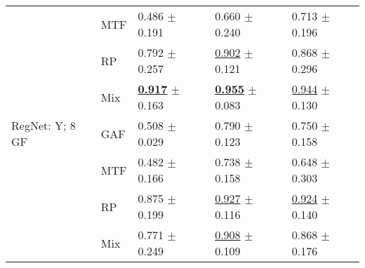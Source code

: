 \begin{tabular}{lllll}
 & MTF & \textcolor[rgb]{0.8357843137,0.1642156863,0}{0.486} $\pm$ \textcolor[rgb]{0.6819485050,0.3180514950,0}{0.191} & \textcolor[rgb]{0.9871624613,0.0128375387,0}{0.660} $\pm$ \textcolor[rgb]{1.0000000000,0.0000000000,0}{0.240} & \textcolor[rgb]{0.7984293194,0.2015706806,0}{0.713} $\pm$ \textcolor[rgb]{0.4651007353,0.5000000000,0}{0.196} \\
 & RP & \textcolor[rgb]{0.2426470588,0.5000000000,0}{0.792} $\pm$ \textcolor[rgb]{0.9202033436,0.0797966564,0}{0.257} & \underline{\textcolor[rgb]{0.1760231800,0.5000000000,0}{0.902}} $\pm$ \textcolor[rgb]{0.3351076707,0.5000000000,0}{0.121} & \textcolor[rgb]{0.3160994764,0.5000000000,0}{0.868} $\pm$ \textcolor[rgb]{0.9535567418,0.0464432582,0}{0.296} \\
 & Mix & \underline{\textbf{\textcolor[rgb]{0.0000000000,0.5000000000,0}{0.917}}} $\pm$ \textcolor[rgb]{0.5819876952,0.4180123048,0}{0.163} & \underline{\textbf{\textcolor[rgb]{0.0000000000,0.5000000000,0}{0.955}}} $\pm$ \textcolor[rgb]{0.1234823448,0.5000000000,0}{0.083} & \underline{\textcolor[rgb]{0.0785340314,0.5000000000,0}{0.944}} $\pm$ \textcolor[rgb]{0.1425478198,0.5000000000,0}{0.130} \\
RegNet: Y; 8 GF & GAF & \textcolor[rgb]{0.7926470588,0.2073529412,0}{0.508} $\pm$ \textcolor[rgb]{0.1031753909,0.5000000000,0}{0.029} & \textcolor[rgb]{0.5512495473,0.4487504527,0}{0.790} $\pm$ \textcolor[rgb]{0.3450987023,0.5000000000,0}{0.123} & \textcolor[rgb]{0.6832460733,0.3167539267,0}{0.750} $\pm$ \textcolor[rgb]{0.2807967733,0.5000000000,0}{0.158} \\
 & MTF & \textcolor[rgb]{0.8438725490,0.1561274510,0}{0.482} $\pm$ \textcolor[rgb]{0.5915852587,0.4084147413,0}{0.166} & \textcolor[rgb]{0.7250996016,0.2749003984,0}{0.738} $\pm$ \textcolor[rgb]{0.5420615539,0.4579384461,0}{0.158} & \textcolor[rgb]{1.0000000000,0.0000000000,0}{0.648} $\pm$ \textcolor[rgb]{0.9855288161,0.0144711839,0}{0.303} \\
 & RP & \textcolor[rgb]{0.0808823529,0.5000000000,0}{0.875} $\pm$ \textcolor[rgb]{0.7127864450,0.2872135550,0}{0.199} & \underline{\textcolor[rgb]{0.0929614874,0.5000000000,0}{0.927}} $\pm$ \textcolor[rgb]{0.3065600430,0.5000000000,0}{0.116} & \underline{\textcolor[rgb]{0.1433246073,0.5000000000,0}{0.924}} $\pm$ \textcolor[rgb]{0.1910808871,0.5000000000,0}{0.140} \\
 & Mix & \textcolor[rgb]{0.2830882353,0.5000000000,0}{0.771} $\pm$ \textcolor[rgb]{0.8901340965,0.1098659035,0}{0.249} & \underline{\textcolor[rgb]{0.1567065073,0.5000000000,0}{0.908}} $\pm$ \textcolor[rgb]{0.2692966353,0.5000000000,0}{0.109} & \textcolor[rgb]{0.3160994764,0.5000000000,0}{0.868} $\pm$ \textcolor[rgb]{0.3666690218,0.5000000000,0}{0.176} \\
\bottomrule
\end{tabular}

